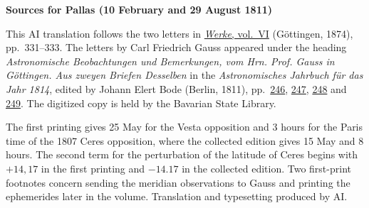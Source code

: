 \clearpage\thispagestyle{empty}
\begin{center}\textbf{Sources for Pallas (10 February and 29 August 1811)}\end{center}
\noindent This AI translation follows the two letters in \href{https://gdz.sub.uni-goettingen.de/id/PPN236007467}{\textit{Werke}, vol.~VI} (Göttingen, 1874), pp.~331--333. The letters by Carl Friedrich Gauss appeared under the heading \textit{Astronomische Beobachtungen und Bemerkungen, vom Hrn. Prof. Gauss in Göttingen. Aus zweyen Briefen Desselben} in the \textit{Astronomisches Jahrbuch für das Jahr 1814}, edited by Johann Elert Bode (Berlin, 1811), pp.~\href{https://api.digitale-sammlungen.de/iiif/image/v2/bsb10538343_00254/full/1600,/0/default.jpg}{246}, \href{https://api.digitale-sammlungen.de/iiif/image/v2/bsb10538343_00255/full/1600,/0/default.jpg}{247}, \href{https://api.digitale-sammlungen.de/iiif/image/v2/bsb10538343_00256/full/1600,/0/default.jpg}{248} and \href{https://api.digitale-sammlungen.de/iiif/image/v2/bsb10538343_00257/full/1600,/0/default.jpg}{249}. The digitized copy is held by the Bavarian State Library.
\par\smallskip\noindent The first printing gives 25 May for the Vesta opposition and 3 hours for the Paris time of the 1807 Ceres opposition, where the collected edition gives 15 May and 8 hours. The second term for the perturbation of the latitude of Ceres begins with $+14{,}17$ in the first printing and $-14.17$ in the collected edition. Two first-print footnotes concern sending the meridian observations to Gauss and printing the ephemerides later in the volume. Translation and typesetting produced by AI.
\clearpage
